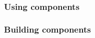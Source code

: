 \subsubsection{Using components}
\label{webware.components.using}

\subsubsection{Building components}
\label{webware.components.building}



